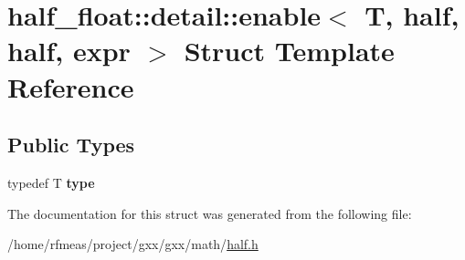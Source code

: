 \hypertarget{structhalf__float_1_1detail_1_1enable_3_01T_00_01half_00_01half_00_01expr_01_4}{}\section{half\+\_\+float\+:\+:detail\+:\+:enable$<$ T, half, half, expr $>$ Struct Template Reference}
\label{structhalf__float_1_1detail_1_1enable_3_01T_00_01half_00_01half_00_01expr_01_4}
\subsection*{Public Types}
\begin{DoxyCompactItemize}
\item 
typedef T {\bfseries type}\hypertarget{structhalf__float_1_1detail_1_1enable_3_01T_00_01half_00_01half_00_01expr_01_4_a25343bb79287a3bce7ff8611d4b40a47}{}\label{structhalf__float_1_1detail_1_1enable_3_01T_00_01half_00_01half_00_01expr_01_4_a25343bb79287a3bce7ff8611d4b40a47}

\end{DoxyCompactItemize}


The documentation for this struct was generated from the following file\+:\begin{DoxyCompactItemize}
\item 
/home/rfmeas/project/gxx/gxx/math/\hyperlink{half_8h}{half.\+h}\end{DoxyCompactItemize}
